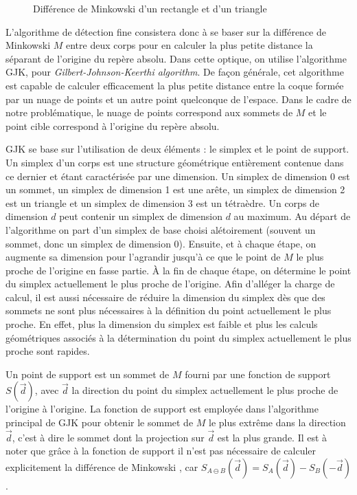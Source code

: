 \begin{figure}
  \centering
  \subfloat[]{  }
  \subfloat[]{  }
  \caption{Différence de Minkowski d'un rectangle et d'un triangle}
  \label{minkowski}
\end{figure}

L'algorithme de détection fine consistera donc à se baser sur la
différence de Minkowski $M$ entre deux corps pour en calculer la plus
petite distance la séparant de l'origine du repère absolu. Dans cette
optique, on utilise l'algorithme GJK, pour
\textit{Gilbert-Johnson-Keerthi algorithm}. De façon générale, cet
algorithme est capable de calculer efficacement la plus petite
distance entre la coque formée par un nuage de points et un autre
point quelconque de l'espace. Dans le cadre de notre problématique, le
nuage de points correspond aux sommets de $M$ et le point cible
correspond à l'origine du repère absolu.

GJK se base sur l'utilisation de deux éléments : le simplex et le
point de support. Un simplex d'un corps est une structure géométrique
entièrement contenue dans ce dernier et étant caractérisée par une
dimension. Un simplex de dimension 0 est un sommet, un simplex de
dimension 1 est une arête, un simplex de dimension 2 est un triangle
et un simplex de dimension 3 est un tétraèdre. Un corps de dimension
$d$ peut contenir un simplex de dimension $d$ au maximum. Au départ de
l'algorithme on part d'un simplex de base choisi alétoirement (souvent
un sommet, donc un simplex de dimension 0). Ensuite, et à chaque
étape, on augmente sa dimension pour l'agrandir jusqu'à ce que le
point de $M$ le plus proche de l'origine en fasse partie. \`A la fin
de chaque étape, on détermine le point du simplex actuellement le plus
proche de l'origine. Afin d'alléger la charge de calcul, il est aussi
nécessaire de réduire la dimension du simplex dès que des sommets ne
sont plus nécessaires à la définition du point actuellement le plus
proche. En effet, plus la dimension du simplex est faible et plus les
calculs géométriques associés à la détermination du point du simplex
actuellement le plus proche sont rapides.

Un point de support est un sommet de $M$ fourni par une fonction de
support $S(\vec{d})$, avec $\vec{d}$ la direction du point du simplex
actuellement le plus proche de l'origine à l'origine. La fonction de
support est employée dans l'algorithme principal de GJK pour obtenir
le sommet de $M$ le plus extrême dans la direction $\vec{d}$, c'est à
dire le sommet dont la projection sur $\vec{d}$ est la plus grande. Il
est à noter que grâce à la fonction de support il n'est pas nécessaire
de calculer explicitement la différence de Minkowski \cite{ericson},
car $S_{A \ominus B}(\vec{d}) = S_A(\vec{d}) - S_B(-\vec{d})$.

